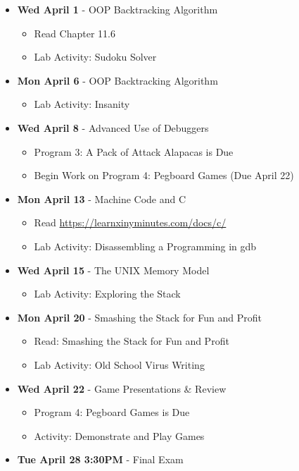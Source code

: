 \begin{itemize}
\item\textbf{Wed April  1} - OOP Backtracking Algorithm
    \begin{itemize}
        \item Read Chapter 11.6 
        \item Lab Activity: Sudoku Solver
    \end{itemize}
\item\textbf{Mon April  6} - OOP Backtracking Algorithm
    \begin{itemize}
        \item Lab Activity: Insanity
    \end{itemize}
\item\textbf{Wed April  8} - Advanced Use of Debuggers
    \begin{itemize}
        \item Program 3: A Pack of Attack Alapacas is Due
        \item Begin Work on Program 4: Pegboard Games (Due April 22)
    \end{itemize}
\item\textbf{Mon April 13} - Machine Code and C
    \begin{itemize}
        \item Read \url{https://learnxinyminutes.com/docs/c/}
        \item Lab Activity: Disassembling a Programming in gdb
    \end{itemize}
\item\textbf{Wed April 15} - The UNIX Memory Model
    \begin{itemize}
        \item Lab Activity: Exploring the Stack
    \end{itemize}
\item\textbf{Mon April 20} - Smashing the Stack for Fun and Profit
    \begin{itemize}
        \item Read: Smashing the Stack for Fun and Profit
        \item Lab Activity: Old School Virus Writing
    \end{itemize}
\item\textbf{Wed April 22} - Game Presentations \& Review
    \begin{itemize}
        \item Program 4: Pegboard Games is Due
        \item Activity: Demonstrate and Play Games
    \end{itemize}
\item\textbf{Tue April 28 3:30PM} - Final Exam
\end{itemize}
\hrulefill
